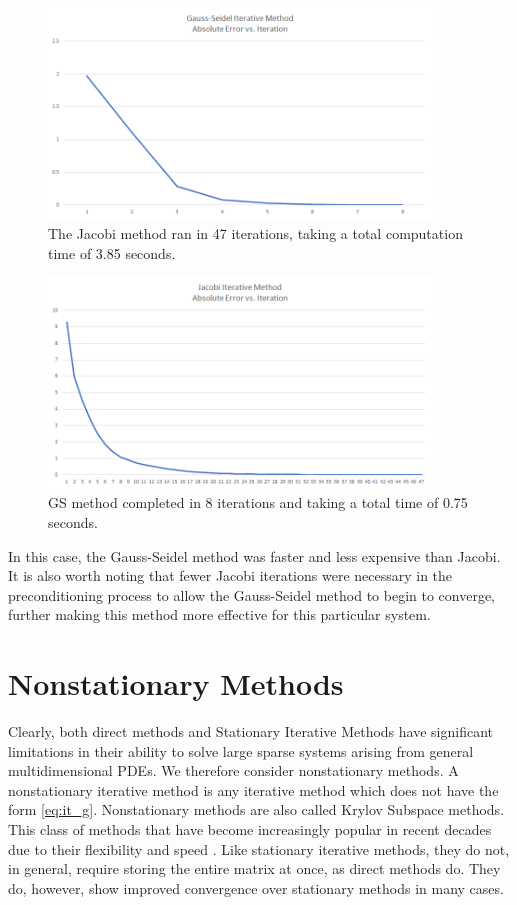 \documentclass[10pt]{article}
\begin{document}
\begin{multicols}{2}
\begin{figure}[H]
	\centering
	\hspace{-.5in}
	\includegraphics[width=4in]{../img/fred_stat_it/img1.png}
	\caption{The Jacobi method ran in 47 iterations, taking a total computation time of 3.85 seconds.}
\end{figure}

\begin{figure}[H]
	\centering
	\hspace{-.5in}
	\includegraphics[width=4in]{../img/fred_stat_it/img2.png}
	\caption{GS method completed in 8 iterations and taking a total time of 0.75 seconds.}
\end{figure}

In this case, the Gauss-Seidel method was faster and less expensive than Jacobi.
It is also worth noting that fewer Jacobi iterations were necessary in the preconditioning process to allow the Gauss-Seidel method to begin to converge, further making this method more effective for this particular system.

\section{Nonstationary Methods}
Clearly, both direct methods and Stationary Iterative Methods have significant limitations in their ability to solve large sparse systems arising from general multidimensional PDEs.
We therefore consider nonstationary methods.
A nonstationary iterative method is any iterative method which does not have the form \eqref{eq:it_g}.
Nonstationary methods are also called Krylov Subspace methods.
This class of methods that have become increasingly popular in recent decades due to their flexibility and speed \citep{gutknecht_brief_2007}.
Like stationary iterative methods, they do not, in general, require storing the entire matrix at once, as direct methods do.
They do, however, show improved convergence over stationary methods in many cases.


\end{multicols}
\end{document}
